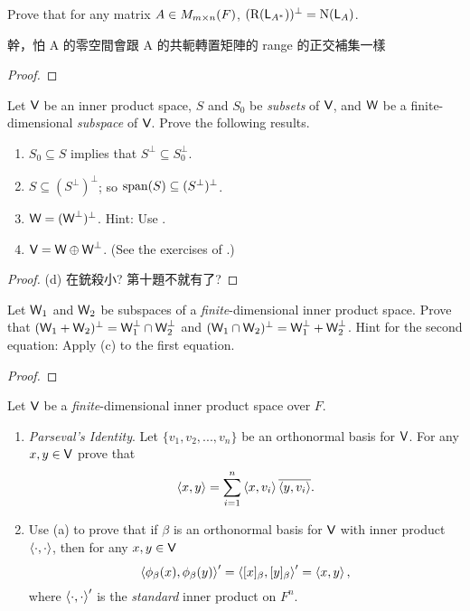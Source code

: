 \begin{exercise} \label{exercise 6.2.12}
Prove that for any matrix \(A \in M_{m \times n}(F)\), \((\mathrm{R}(\textsf{L}_{A^*}))^{\perp} = \mathrm{N}(\textsf{L}_A)\).
\end{exercise}

\begin{note}
幹，怕
A 的零空間會跟 A 的共軛轉置矩陣的 range 的正交補集一樣
\end{note}

\begin{proof}
\end{proof}

\begin{exercise} \label{exercise 6.2.13}
Let \(\textsf{V}\) be an inner product space, \(S\) and \(S_0\) be \emph{subsets} of \(\textsf{V}\), and \(\textsf{W}\) be a finite-dimensional \emph{subspace} of \(\textsf{V}\).
Prove the following results.
\begin{enumerate}
\item \(S_0 \subseteq S\) implies that \(S^{\perp} \subseteq S_0^{\perp}\).
\item \(S \subseteq (S^{\perp})^{\perp}\); so \(\operatorname{span}(S) \subseteq (S^{\perp})^{\perp}\).
\item \(\textsf{W} = (\textsf{W}^{\perp})^{\perp}\). Hint: Use .
\item \(\textsf{V} = \textsf{W} \oplus \textsf{W}^{\perp}\). (See the exercises of .)
\end{enumerate}
\end{exercise}

\begin{proof}
(d) 在銃殺小? 第十題不就有了?
\end{proof}

\begin{exercise} \label{exercise 6.2.14}
Let \(\textsf{W}_1\) and \(\textsf{W}_2\) be subspaces of a \emph{finite}-dimensional inner product space.
Prove that \((\textsf{W}_1 + \textsf{W}_2)^{\perp} = \textsf{W}_1^{\perp} \cap \textsf{W}_2^{\perp}\) and \((\textsf{W}_1 \cap \textsf{W}_2)^{\perp} = \textsf{W}_1^{\perp} + \textsf{W}_2^{\perp}\).
Hint for the second equation: Apply (c) to the first equation.
\end{exercise}

\begin{proof}
\end{proof}

\begin{exercise} \label{exercise 6.2.15}
Let \(\textsf{V}\) be a \emph{finite}-dimensional inner product space over \(F\).
\begin{enumerate}
\item \emph{Parseval's Identity}.
Let \(\{ v_1, v_2, ..., v_n \}\) be an orthonormal basis for \(\textsf{V}\).
For any \(x, y \in \textsf{V}\) prove that
\[
    \left< x, y \right> = \sum_{i = 1}^n \left< x, v_i \right> \overline{\left< y, v_i \right>}.
\]
\item Use (a) to prove that if \(\beta\) is an orthonormal basis for \(\textsf{V}\) with inner product \(\left< \cdot, \cdot \right>\), then for any \(x, y \in \textsf{V}\)
\[
    \left< \phi_{\beta}(x), \phi_{\beta}(y) \right>' = \left< [x]_{\beta}, [y]_{\beta} \right>' = \left< x, y \right>,
\]
where \(\left< \cdot, \cdot \right>'\) is the \emph{standard} inner product on \(F^n\).
\end{enumerate}
\end{exercise}

